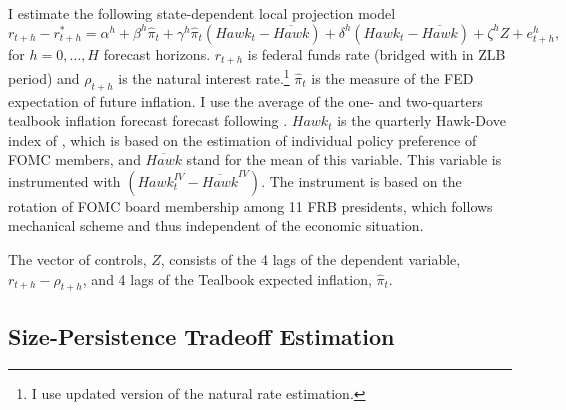 \documentclass[12pt]{article}
\numberwithin{equation}{section}
\begin{document}
I estimate the following state-dependent local projection model 
\begin{equation}
    r_{t+h}-r^*_{t+h}=\alpha^h+\beta^h \hat\pi_t+\gamma^h \hat\pi_t\left(\mathit{Hawk}_{t}-\overline{\mathit{Hawk}}\right)+\delta^h\left(\mathit{Hawk}_{t}-\overline{\mathit{Hawk}}\right)+\zeta^hZ+e_{t+h}^h,
\end{equation}
for $h=0,\dots, H$ forecast horizons. $r_{t+h}$ is federal funds rate (bridged with \citet{WuXia2016} in ZLB period) and $\rho_{t+h}$ is the \citet{LW2003} natural interest rate.\footnote{I use \citet{HLW2023} updated version of the \citet{LW2003} natural rate estimation.}
$\hat\pi_t$ is the measure of the FED expectation of future inflation. I use the average of the one- and two-quarters  tealbook inflation forecast forecast following \citet{CoibionGorodnichenko2011}. 
$\mathit{Hawk}_t$ is the quarterly Hawk-Dove index of \citet{HIM2023}, which is based on the \citet{Istrefi2019,BordoIstrefi2023} estimation of individual policy preference of FOMC members, and $\overline{\mathit{Hawk}}$ stand for the mean of this variable.
This variable is instrumented with $\left(\mathit{Hawk}_{t}^\mathit{IV}-\overline{\mathit{Hawk}}^\mathit{IV}\right)$. The instrument is based on the rotation of FOMC board membership among 11 FRB presidents, which follows mechanical scheme and thus independent of the economic situation.

The vector of controls, $Z$, consists of the 4 lags of the dependent variable, $r_{t+h}-\rho_{t+h}$, and 4 lags of the Tealbook expected inflation, $\hat\pi_t$.

\subsection{Size-Persistence Tradeoff Estimation}
\end{document}
